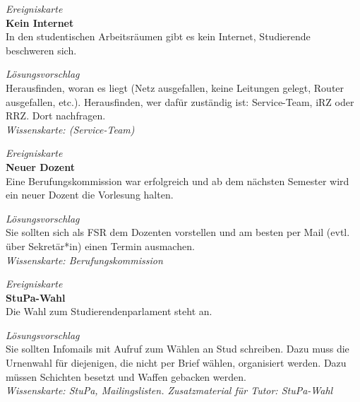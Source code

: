 \documentclass[a4paper,11pt]{scrartcl} %
\begin{document}
\begin{framed}
\textit{Ereigniskarte} \\

\textbf{Kein Internet} \\
In den studentischen Arbeitsräumen gibt es kein Internet,
Studierende beschweren sich.
\end{framed}

\begin{framed}
\textit{Lösungsvorschlag} \\

Herausfinden, woran es liegt (Netz ausgefallen, keine Leitungen gelegt, 
Router ausgefallen, etc.). Herausfinden, wer dafür zuständig ist: Service-Team, 
iRZ oder RRZ. Dort nachfragen. \\

\textit{Wissenskarte: (Service-Team)}
\end{framed}

\begin{framed}
\textit{Ereigniskarte} \\

\textbf{Neuer Dozent} \\
Eine Berufungskommission war erfolgreich und ab dem nächsten Semester
wird ein neuer Dozent die Vorlesung halten.

\end{framed}

\begin{framed}
\textit{Lösungsvorschlag} \\

Sie sollten sich als FSR dem Dozenten vorstellen und am besten per Mail
(evtl. über Sekretär*in) einen Termin ausmachen. \\


\textit{Wissenskarte: Berufungskommission}
\end{framed}

\begin{framed}
\textit{Ereigniskarte} \\

\textbf{StuPa-Wahl} \\
Die Wahl zum Studierendenparlament steht an.
\end{framed}

\begin{framed}
\textit{Lösungsvorschlag} \\

Sie sollten Infomails mit Aufruf zum Wählen an Stud schreiben. Dazu 
muss die Urnenwahl für diejenigen, die nicht per Brief wählen, 
organisiert werden. Dazu müssen Schichten besetzt und Waffen gebacken werden. \\

\textit{Wissenskarte: StuPa, Mailingslisten. Zusatzmaterial für Tutor: 
StuPa-Wahl}
\end{framed}
\end{document}
